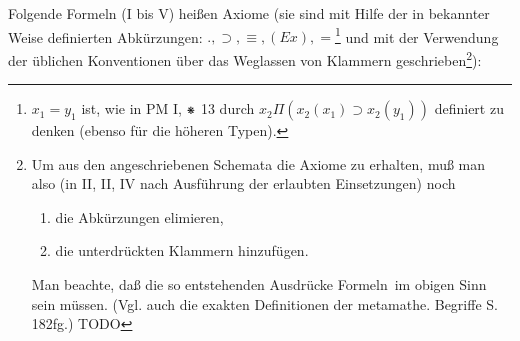 \documentclass[draft]{scrartcl}
\DeclareRobustCommand*{\pmstar}{%
  \text{%
      \resizebox{!}{.75\height}{\ding{107}}%
        }%
}
\let\oldleft\left
\let\oldright\right
\def\left#1{%
	    \global\advance\bracketnum1\relax 
		\colorlet{temp}{.}%
		    \csname bracketcolor\the\bracketnum\endcsname
			\oldleft#1%
			    \color{temp}%
	}
\def\right#1{%
	    \colorlet{temp}{.}%
		\csname bracketcolor\the\bracketnum\endcsname
		    \oldright#1%
			\global\advance\bracketnum-1\relax
			    \color{temp}%
	}
\def\left#1{#1}
\def\right#1{#1}
\begin{document}
Folgende Formeln (I bis V) heißen Axiome (sie 
sind mit Hilfe der in bekannter Weise definierten Abkürzungen:
$., \supset, \equiv, \left(Ex\right), =$\footnote{$x_1 = y_1$ ist, 
wie in PM I, $\pmstar$ 13 durch 
$x_2\Pi\left(x_2\left(x_1\right) \supset x_2\left(y_1\right)\right)$ 
definiert zu denken (ebenso für die höheren Typen).}
und mit der Verwendung der üblichen Konventionen über
das Weglassen von Klammern geschrieben\footnote{Um aus den
angeschriebenen Schemata die Axiome zu erhalten, 
muß man also (in II, II, IV nach Ausführung der erlaubten Einsetzungen) noch
\begin{enumerate}
\item die Abkürzungen elimieren,
\item die unterdrückten Klammern hinzufügen.
\end{enumerate}

Man beachte, daß die so entstehenden Ausdrücke \glqq Formeln\grqq\ im obigen Sinn sein müssen. (Vgl. auch die 
exakten Definitionen der metamathe. Begriffe S. 182fg.) TODO}):
\end{document}
